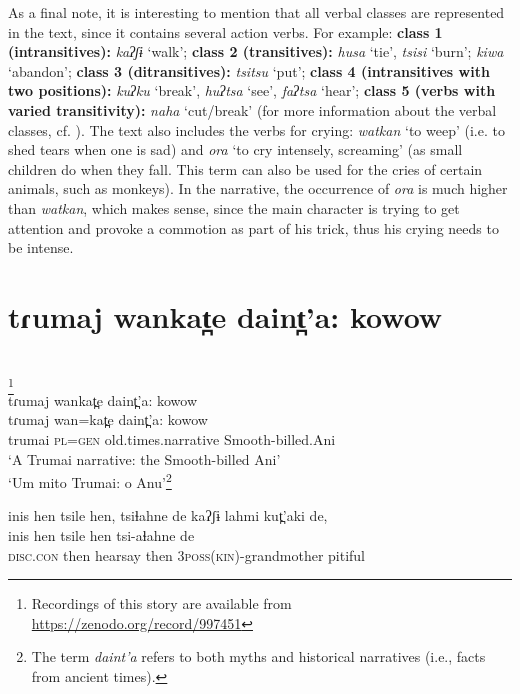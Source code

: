 \documentclass[output=paper,
modfonts,nonflat
]{langsci/langscibook}
\begin{document}
As a final note, it is interesting to mention that all verbal classes are represented in the text, since it contains several action verbs. For example:  \textbf{class 1 (intransitives):} \textit{kaʔʃɨ}  ‘walk'; \textbf{class 2 (transitives):} \textit{husa} ‘tie', \textit{tsisi} ‘burn'; \textit{kiwa} ‘abandon'; \textbf{class 3 (ditransitives):} \textit{tsitsu} ‘put'; \textbf{class 4 (intransitives with two positions):} \textit{kuʔku} ‘break', \textit{huʔtsa} ‘see', \textit{faʔtsa} ‘hear'; \textbf{class 5 (verbs with varied transitivity):}  \textit{naha} ‘cut/break' (for more information about the verbal classes, cf. \citealt{Guirardello-Damian2010}). The text also includes the verbs for crying: \textit{watkan} ‘to weep' (i.e. to shed tears when one is sad) and \textit{ora} ‘to cry intensely, screaming' (as small children do when they fall. This term can also be used for the cries of certain animals, such as monkeys). In the narrative, the occurrence of \textit{ora} is much higher than \textit{watkan}, which makes sense, since the main character is trying to get attention and provoke a commotion as part of his trick, thus his crying needs to be intense.


\newpage 
\section{tɾumaj wankat̪e daint̪'a: kowow}
\\
\footnote{Recordings of this story are available from \url{https://zenodo.org/record/997451}}\\[.3em]

\ea tɾumaj wankat̪e daint̪'a: kowow\\[.3em]
\gll tɾumaj  wan=kat̪e  daint̪'a: kowow\\
trumai \textsc{pl}=\textsc{gen} old.times.narrative   Smooth-billed.Ani\\
\glt ‘A Trumai narrative: the Smooth-billed Ani'\\
‘Um mito Trumai: o Anu'\footnote{The term \textit{daint'a} refers to both myths and historical narratives (i.e., facts from ancient times).}
\z


\ea inis hen tsile hen, tsiɬahne de kaʔʃɨ lahmi kut̪'aki de,\\ [.3em]
\gll inis hen tsile hen tsi-aɬahne de\\  
\textsc{disc.con}  then   hearsay   then   \textsc{3poss(kin)}-grandmother  pitiful\\  
\end{document}

